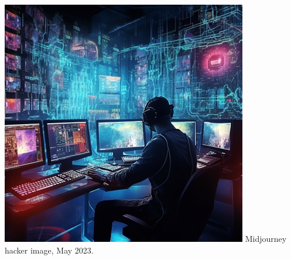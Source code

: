 \documentclass[11pt,
               aspectratio=169,
               hyperref={colorlinks}
               ]{beamer}
\begin{document}
\begin{frame}
\begin{columns}
				\centering
				\newline
				\includegraphics[width=\textwidth]{../img/security.png} 
				\newline
				\tiny{Midjourney hacker image, May 2023.}
			\end{columns}
					
		\end{frame}
		
\end{document}
